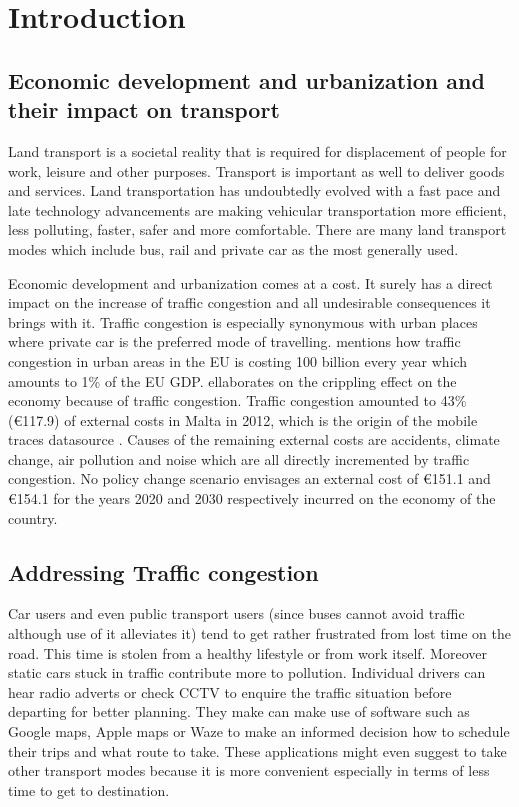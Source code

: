 \documentclass[12pt, a4paper]{report}
\theoremstyle{definition}
\theoremstyle{definition}%
\theoremstyle{definition}%
\theoremstyle{definition}%
\theoremstyle{definition}%
\theoremstyle{definition}%
\begin{document}
\chapter{Introduction}

\section{Economic development and urbanization and their impact on transport}

Land transport is a societal reality that is required for displacement of people for work, 
leisure and other purposes. Transport is important as well to deliver goods and services. Land transportation has undoubtedly evolved with a fast pace and late technology advancements are making vehicular transportation more efficient, less polluting, faster, safer and more comfortable. There are many land transport modes which include bus, rail and private car as the most generally used.

Economic development and urbanization comes at a cost. It surely has a direct impact on the increase of traffic congestion and all undesirable consequences it brings with it. Traffic congestion is especially synonymous with urban places where private car is the preferred mode of travelling. \cite{EUTransportDirectorate2018} mentions how traffic congestion in urban areas in the EU is costing 100 billion every year which amounts to 1\% of the EU GDP. \cite{Colak2015} ellaborates on the crippling effect on the economy because of traffic congestion. Traffic congestion amounted to 43\% (€117.9) of external costs in Malta in 2012, which is the origin of the mobile traces datasource \cite{Attard2015}. Causes of the remaining external costs are accidents, climate change, air pollution and noise which are all directly incremented by traffic congestion. No policy change scenario envisages an external cost of €151.1 and €154.1 for the years 2020 and 2030 respectively incurred on the economy of the country.

\section{Addressing Traffic congestion}

Car users and even public transport users (since buses cannot avoid traffic although use of it alleviates it) tend to get rather frustrated from lost time on the road. This time is stolen from a healthy lifestyle or from work itself. Moreover static cars stuck in traffic contribute more to pollution. Individual drivers can hear radio adverts or check CCTV to enquire the traffic situation before departing for better planning. They make can make use of software such as Google maps, Apple maps or Waze to make an informed decision how to schedule their trips and what route to take.  These applications might even suggest to take other transport modes because it is more convenient especially in terms of less time to get to destination.
\end{document}

